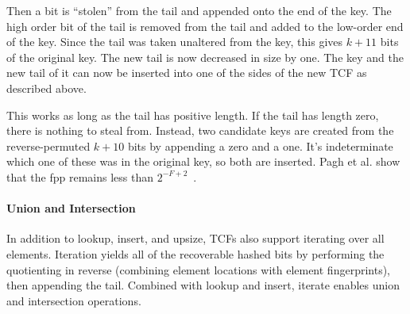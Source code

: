 \documentclass[letterpaper,twocolumn,10pt]{article}
\newcommand{\ints}{\mathbb{Z}}
\newcommand{\etal}{et al.}
\begin{document}
Then a bit is ``stolen'' from the tail and appended onto the end of the key. %
The high order bit of the tail is removed from the tail and added to the low-order end of the key.
Since the tail was taken unaltered from the key, this gives $k+11$ bits of the original key.
The new tail is now decreased in size by one.
The key and the new tail of it can now be inserted into one of the sides of the new TCF as described above. %

This works as long as the tail has positive length.
If the tail has length zero, there is nothing to steal from.
Instead, two candidate keys are created from the reverse-permuted $k+10$ bits by appending a zero and a one. %
It's indeterminate which one of these was in the original key, so both are inserted. %
Pagh \etal{} show that the fpp remains less than $2^{-F+2}$~\cite{psw}.



\paragraph{Union and Intersection}
In addition to lookup, insert, and upsize, TCFs also support iterating over all elements.
Iteration yields all of the recoverable hashed bits by performing the quotienting in reverse (combining element locations with element fingerprints), then appending the tail. %
Combined with lookup and insert, iterate enables union and intersection operations.
\end{document}
